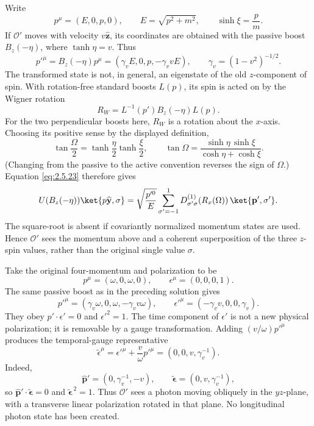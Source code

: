 \ExerciseEditorialNote

\begin{enumerate}
Write
\[
  p^\mu=(E,0,p,0),\qquad
  E=\sqrt{p^2+m^2},\qquad
  \sinh\xi=\frac{p}{m}.
\]
If \(\mathcal O'\) moves with velocity \(v\widehat{\mathbf z}\), its
coordinates are obtained with the passive boost \(B_z(-\eta)\), where
\(\tanh\eta=v\).  Thus
\[
  p'^\mu=B_z(-\eta)p^\mu
    =(\gamma_vE,0,p,-\gamma_vvE),
  \qquad \gamma_v=(1-v^2)^{-1/2}.
\]
The transformed state is not, in general, an eigenstate of the old
\(z\)-component of spin.  With rotation-free standard boosts \(L(p)\), its
spin is acted on by the Wigner rotation
\[
  R_W=L^{-1}(p')B_z(-\eta)L(p).
\]
For the two perpendicular boosts here, \(R_W\) is a rotation about the
\(x\)-axis.  Choosing its positive sense by the displayed definition,
\[
  \tan\frac{\Omega}{2}
    =\tanh\frac{\eta}{2}\tanh\frac{\xi}{2},
  \qquad
  \tan\Omega=\frac{\sinh\eta\,\sinh\xi}
  {\cosh\eta+\cosh\xi}.
\]
(Changing from the passive to the active convention reverses the sign of
\(\Omega\).)  Equation \eqref{eq:2.5.23} therefore gives
\[
  U(B_z(-\eta))\ket{p\widehat{\mathbf y},\sigma}
  =\sqrt{\frac{p'^0}{E}}
    \sum_{\sigma'=-1}^{1}
    D^{(1)}_{\sigma'\sigma}\!\left(R_x(\Omega)\right)
    \ket{\mathbf p',\sigma'}.
\]
The square-root is absent if covariantly normalized momentum states are
used.  Hence \(\mathcal O'\) sees the momentum above and a coherent
superposition of the three \(z\)-spin values, rather than the original
single value \(\sigma\).

Take the original four-momentum and polarization to be
\[
  p^\mu=(\omega,0,\omega,0),\qquad
  \epsilon^\mu=(0,0,0,1).
\]
The same passive boost as in the preceding solution gives
\[
  p'^\mu=(\gamma_v\omega,0,\omega,-\gamma_vv\omega),
  \qquad
  \epsilon'^\mu=(-\gamma_vv,0,0,\gamma_v).
\]
They obey \(p'\cdot\epsilon'=0\) and
\(\epsilon'^2=1\).  The time component of \(\epsilon'\) is not a new
physical polarization; it is removable by a gauge transformation.  Adding
\((v/\omega)p'^\mu\) produces the temporal-gauge representative
\[
  \widetilde\epsilon^\mu
   =\epsilon'^\mu+\frac{v}{\omega}p'^\mu
   =(0,0,v,\gamma_v^{-1}).
\]
Indeed,
\[
  \widehat{\mathbf p}'=(0,\gamma_v^{-1},-v),\qquad
  \widetilde{\boldsymbol\epsilon}=(0,v,\gamma_v^{-1}),
\]
so \(\widehat{\mathbf p}'\cdot\widetilde{\boldsymbol\epsilon}=0\) and
\(\widetilde{\boldsymbol\epsilon}^{\,2}=1\).  Thus \(\mathcal O'\) sees a
photon moving obliquely in the \(yz\)-plane, with a transverse linear
polarization rotated in that plane.  No longitudinal photon state has been
created.


\end{enumerate}

